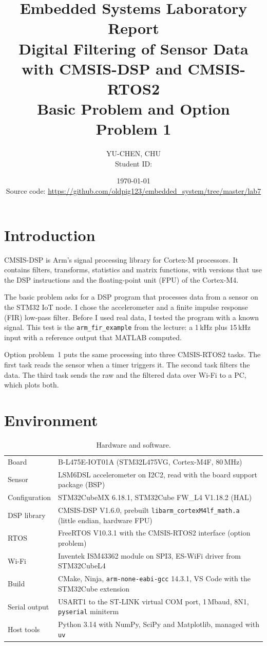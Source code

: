 \documentclass[11pt,a4paper]{article}
\title{Embedded Systems Laboratory Report\\
       \large Digital Filtering of Sensor Data with CMSIS-DSP and CMSIS-RTOS2\\
       \normalsize Basic Problem and Option Problem 1}
\author{YU-CHEN, CHU\\
        \normalsize Student ID: \studentid}
\date{\today\\[2ex]
      \normalsize Source code:
      \url{https://github.com/oldpig123/embedded_system/tree/master/lab7}}
\begin{document}
\maketitle
\tableofcontents
\newpage

\section{Introduction}

CMSIS-DSP is Arm's signal processing library for Cortex-M processors. It
contains filters, transforms, statistics and matrix functions, with versions
that use the DSP instructions and the floating-point unit (FPU) of the
Cortex-M4.

The basic problem asks for a DSP program that processes data from a sensor on
the STM32 IoT node. I chose the accelerometer and a finite impulse response
(FIR) low-pass filter. Before I used real data, I tested the program with a
known signal. This test is the \texttt{arm\_fir\_example} from the lecture:
a 1\,kHz plus 15\,kHz input with a reference output that MATLAB computed.

Option problem~1 puts the same processing into three CMSIS-RTOS2 tasks. The
first task reads the sensor when a timer triggers it. The second task filters
the data. The third task sends the raw and the filtered data over Wi-Fi to a
PC, which plots both.

\section{Environment}

\begin{table}[h]
\centering
\caption{Hardware and software.}
\begin{tabular}{@{}lp{11.5cm}@{}}
\toprule
Board            & B-L475E-IOT01A (STM32L475VG, Cortex-M4F, 80\,MHz) \\
Sensor           & LSM6DSL accelerometer on I2C2, read with the board support package (BSP) \\
Configuration    & STM32CubeMX 6.18.1, STM32Cube FW\_L4 V1.18.2 (HAL) \\
DSP library      & CMSIS-DSP V1.6.0, prebuilt \texttt{libarm\_cortexM4lf\_math.a} (little endian, hardware FPU) \\
RTOS             & FreeRTOS V10.3.1 with the CMSIS-RTOS2 interface (option problem) \\
Wi-Fi            & Inventek ISM43362 module on SPI3, ES-WiFi driver from STM32CubeL4 \\
Build            & CMake, Ninja, \texttt{arm-none-eabi-gcc} 14.3.1, VS Code with the STM32Cube extension \\
Serial output    & USART1 to the ST-LINK virtual COM port, 1\,Mbaud, 8N1, \texttt{pyserial} miniterm \\
Host tools       & Python 3.14 with NumPy, SciPy and Matplotlib, managed with \texttt{uv} \\
\bottomrule
\end{tabular}
\end{table}
\end{document}
